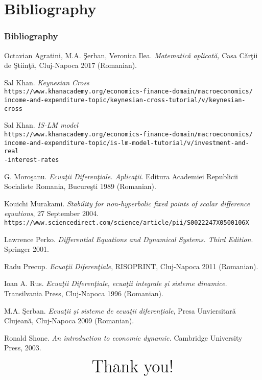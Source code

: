 \documentclass[11]{beamer}
\begin{document}
\section{Bibliography}
\begin{frame}
\frametitle{Bibliography}
 \begin{thebibliography}{9}

  Octavian Agratini, M.A. \c{S}erban, Veronica Ilea. \textit{Matematic\u{a} aplicat\u{a},} Casa C\u{a}r\c{t}ii de \c{S}tiin\c{t}\u{a}, Cluj-Napoca 2017 (Romanian). 

 Sal Khan. \textit{Keynesian Cross}
 \\\texttt{https://www.khanacademy.org/economics-finance-domain/macroeconomics/\\income-and-expenditure-topic/keynesian-cross-tutorial/v/keynesian-cross}
 
 Sal Khan. \textit{IS-LM model}
 \\\texttt{https://www.khanacademy.org/economics-finance-domain/macroeconomics/\\income-and-expenditure-topic/is-lm-model-tutorial/v/investment-and-real\\-interest-rates}
 
 G. Moro\c{s}anu. \textit{Ecua\c{t}ii Diferen\c{t}iale. Aplica\c{t}ii}. Editura Academiei Republicii Socialiste Romania, Bucure\c{s}ti 1989 (Romanian).
 

 \end{thebibliography}
 \end{frame}
 \begin{frame}
 
 \begin{thebibliography}{9}
 Kouichi Murakami. \textit{Stability for non-hyperbolic fixed points of scalar difference equations}, 27 September 2004.
 \\\texttt{https://www.sciencedirect.com/science/article/pii/S0022247X0500106X}
 
 Lawrence Perko. \textit{Differential Equations and Dynamical Systems. Third Edition}. Springer 2001.
 
 Radu Precup. \textit{Ecua\c{t}ii Diferen\c{t}iale}, RISOPRINT, Cluj-Napoca 2011 (Romanian).
 
 Ioan A. Rus. \textit{Ecua\c{t}ii Diferen\c{t}iale, ecua\c{t}ii integrale \c{s}i sisteme dinamice.} Transilvania Press, Cluj-Napoca 1996 (Romanian).

  M.A. \c{S}erban. \textit{Ecua\c{t}ii \c{s}i sisteme de ecua\c{t}ii diferen\c{t}iale}, Presa Unviersitar\u{a} Clujean\u{a}, Cluj-Napoca 
  2009 (Romanian).
  
 
 Ronald Shone. \textit{An introduction to economic dynamic.} Cambridge University Press, 2003.


\end{thebibliography}
\end{frame}

\begin{frame}
\begin{equation*}
\text{\Huge{Thank you!}}
\end{equation*}
\end{frame}
\end{document}
